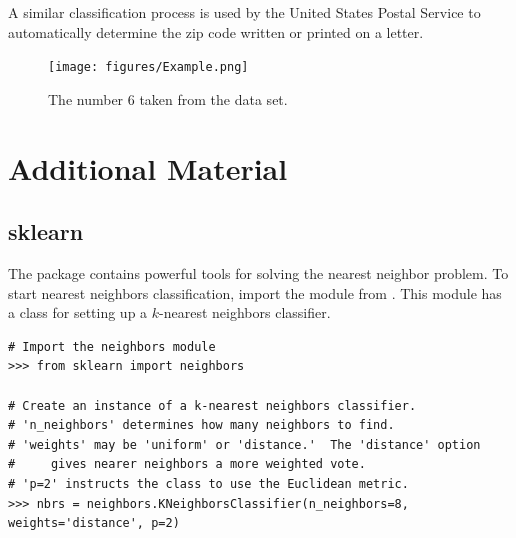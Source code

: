\begin{problem}

A similar classification process is used by the United States Postal Service to automatically determine the zip code written or printed on a letter.

\begin{figure}[H]
\texttt{[image: figures/Example.png]}
\caption{The number 6 taken from the data set.}
\label{fig:digit}
\end{figure}
\end{problem}

\newpage

\section*{Additional Material}

\subsection*{sklearn}
The  package contains powerful tools for solving the nearest neighbor problem.
To start nearest neighbors classification, import the  module from .
This module has a class for setting up a $k$-nearest neighbors classifier.

\begin{lstlisting}
# Import the neighbors module
>>> from sklearn import neighbors

# Create an instance of a k-nearest neighbors classifier.
# 'n_neighbors' determines how many neighbors to find.
# 'weights' may be 'uniform' or 'distance.'  The 'distance' option
#     gives nearer neighbors a more weighted vote.
# 'p=2' instructs the class to use the Euclidean metric.
>>> nbrs = neighbors.KNeighborsClassifier(n_neighbors=8, weights='distance', p=2)
\end{lstlisting}


